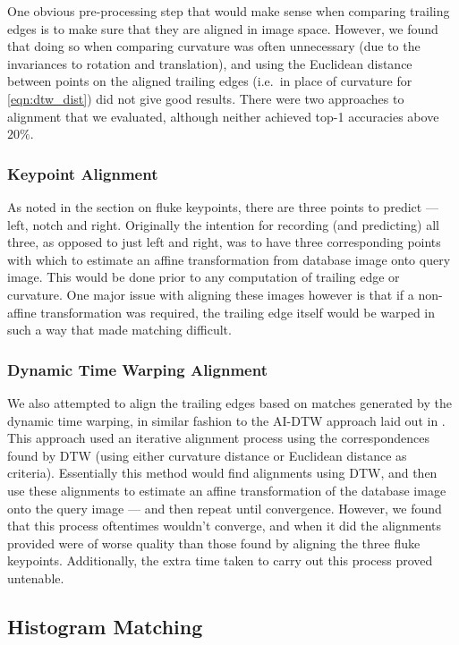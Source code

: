 One obvious pre-processing step that would make sense when comparing trailing edges is to make sure that they are aligned in image space.
However, we found that doing so when comparing curvature was often unnecessary (due to the invariances to rotation and translation), and using the Euclidean distance between points on the aligned trailing edges (i.e.\ in place of curvature for \eqref{eqn:dtw_dist}) did not give good results.
There were two approaches to alignment that we evaluated, although neither achieved top-1 accuracies above $20\%$.

\subsubsection{Keypoint Alignment}

As noted in the section on fluke keypoints, there are three points to predict --- left, notch and right.
Originally the intention for recording (and predicting) all three, as opposed to just left and right, was to have three corresponding points with which to estimate an affine transformation from database image onto query image.
This would be done prior to any computation of trailing edge or curvature.
One major issue with aligning these images however is that if a non-affine transformation was required, the trailing edge itself would be warped in such a way that made matching difficult.

\subsubsection{Dynamic Time Warping Alignment}

We also attempted to align the trailing edges based on matches generated by the dynamic time warping, in similar fashion to the AI-DTW approach laid out in \cite{qiao2006affine}.
This approach used an iterative alignment process using the correspondences found by DTW (using either curvature distance or Euclidean distance as criteria).
Essentially this method would find alignments using DTW, and then use these alignments to estimate an affine transformation of the database image onto the query image --- and then repeat until convergence.
However, we found that this process oftentimes wouldn't converge, and when it did the alignments provided were of worse quality than those found by aligning the three fluke keypoints.
Additionally, the extra time taken to carry out this process proved untenable.

\subsection{Histogram Matching}

